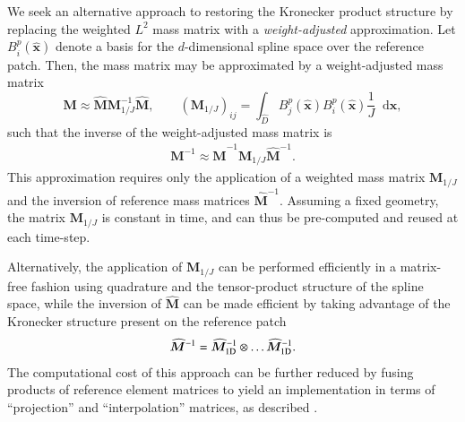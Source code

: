 \documentclass[preprint,10pt]{elsarticle}
\newcommand{\LRp}[1]{\left( #1 \right)}
\newcommand{\Dhat}{\widehat{D}}
\newcommand{\reviewerTwo}[1]{#1}
\newcommand*\diff[1]{\mathop{}\!{\mathrm{d}#1}}
\begin{document}
We seek an alternative approach to restoring the Kronecker product structure by replacing the weighted $L^2$ mass matrix with a \textit{weight-adjusted} approximation.  Let $B^p_i(\widehat{\bm{x}})$ denote a basis for the $d$-dimensional spline space over the reference patch.  Then, the mass matrix may be approximated by a weight-adjusted mass matrix
\[
\bm{M} \approx \widehat{\bm{M}} \bm{M}^{-1}_{1/J} \widehat{\bm{M}}, \qquad \reviewerTwo{ \LRp{\bm{M}_{1/J}}_{ij} }= \int_{\Dhat} B^p_j(\widehat{\bm{x}})B^p_i(\widehat{\bm{x}}) \frac{1}{J} \diff{\widehat{\bm{x}}},
\]
such that the inverse of the weight-adjusted mass matrix is 
\begin{align*}
\bm{M}^{-1} \approx \widehat{\bm{M}}^{-1} \bm{M}_{1/J} \widehat{\bm{M}}^{-1}.
\end{align*}
This approximation requires only the application of a weighted mass matrix $\bm{M}_{1/J}$ and the inversion of reference mass matrices $\widehat{\bm{M}}^{-1}$.  
\reviewerTwo{Assuming a fixed geometry, the matrix $\bm{M}_{1/J}$ is constant in time, and can thus be pre-computed and reused at each time-step.  
}
Alternatively, the application of $\bm{M}_{1/J}$ can be performed efficiently in a matrix-free fashion using quadrature and the tensor-product structure of the spline space, while the inversion of $\widehat{\bm{M}}$ can be made efficient by taking advantage of the Kronecker structure present on the reference patch
\[
\widehat{\bm{M}}^{-1} = \widehat{\bm{M}}_{\rm 1D}^{-1} \otimes \ldots  \widehat{\bm{M}}_{\rm 1D}^{-1}.  
\]
The computational cost of this approach can be further reduced by fusing products of reference element matrices to yield an implementation in terms of ``projection'' and ``interpolation'' matrices, as described \cite{chan2016weight1, chan2016weight2}.  
\end{document}
